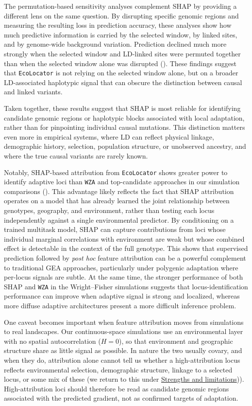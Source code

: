 \documentclass[]{article}
\newcommand{\ecolocator}{\texttt{EcoLocator}\xspace}
\begin{document}
The permutation-based sensitivity analyses
complement SHAP by providing a different lens
on the same question.
By disrupting specific genomic regions
and measuring the resulting loss in prediction accuracy,
these analyses show how much predictive information is carried
by the selected window,
by linked sites,
and by genome-wide background variation.
Prediction declined much more strongly
when the selected window and LD-linked sites were permuted together
than when the selected window alone was disrupted
().
These findings suggest that \ecolocator is not relying
on the selected window alone,
but on a broader LD-associated haplotypic signal
that can obscure the distinction between causal and linked variants.

Taken together, these results suggest that SHAP is most reliable for
identifying candidate genomic regions or haplotypic blocks associated
with local adaptation, rather than for pinpointing individual causal
mutations. This distinction matters even more in empirical systems,
where LD can reflect physical linkage, demographic history, selection,
population structure, or unobserved ancestry, and where the true
causal variants are rarely known.

Notably,
SHAP-based attribution from \ecolocator
shows greater power to identify adaptive loci
than \texttt{WZA} \citep{booker_wza_2024}
and top-candidate approaches
in our simulation comparisons
().
This advantage likely reflects the fact
that SHAP attribution operates on a model
that has already learned the joint relationship
between genotypes,
geography,
and environment,
rather than testing each locus independently
against a single environmental predictor.
By conditioning on a trained multitask model,
SHAP can capture contributions from loci
whose individual marginal correlations with environment are weak
but whose combined effect is detectable
in the context of the full genotype.
This shows that supervised prediction
followed by \textit{post hoc} feature attribution
can be a powerful complement to traditional GEA approaches,
particularly under polygenic adaptation
where per-locus signals are subtle.
At the same time, 
the stronger performance of both SHAP and \texttt{WZA}
in the Wright--Fisher simulations suggests that 
locus-identification performance can improve 
when adaptive signal is strong and localized,
whereas more diffuse adaptive architectures 
present a more difficult inference problem.

One caveat becomes important when feature attribution moves
from simulations to real landscapes.
 Our continuous-space simulations use an environmental layer with no spatial autocorrelation ($H=0$), so that environment and geographic structure share as little signal as possible.
In nature the two usually covary, and when they do,
attribution alone cannot tell us whether a high-attribution locus
reflects environmental selection, demographic structure,
linkage to a selected locus, or some mix of these
(we return to this under \hyperref[sec:strengths-limitations]{Strengths and limitations})).
High-attribution loci should therefore be read as candidate
genomic regions associated with the predicted gradient,
not as confirmed targets of adaptation.
\end{document}
